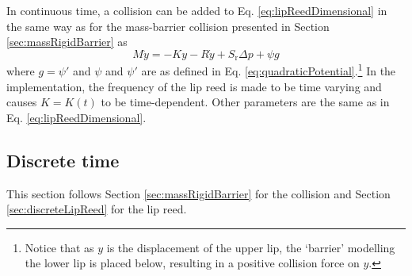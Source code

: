 In continuous time, a collision can be added to Eq. \eqref{eq:lipReedDimensional} in the same way as for the mass-barrier collision presented in Section \ref{sec:massRigidBarrier} as
\begin{equation}\label{eq:lipWithCollisionCont}
    M\ddot y = -K y - R \dot y + S_\text{r}\Delta p + \psi g
\end{equation}
where $g = \psi'$ and $\psi$ and $\psi'$ are as defined in Eq. \eqref{eq:quadraticPotential}.\footnote{Notice that as $y$ is the displacement of the upper lip, the `barrier' modelling the lower lip is placed below, resulting in a positive collision force on $y$.} In the implementation, the frequency of the lip reed is made to be time varying and causes $K = K(t)$ to be time-dependent. Other parameters are the same as in Eq. \eqref{eq:lipReedDimensional}.

\subsection{Discrete time}
This section follows Section \ref{sec:massRigidBarrier} for the collision and Section \ref{sec:discreteLipReed} for the lip reed.

